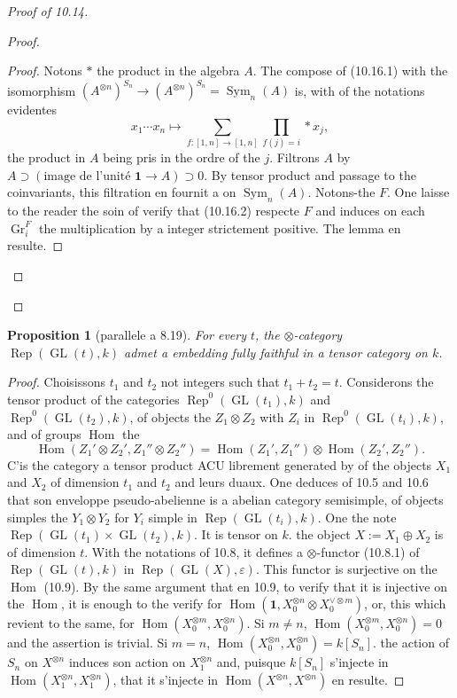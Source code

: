 \documentclass[11pt,a4paper]{article}
\theoremstyle{plain}
\newtheorem{proposition}[theorem]{Proposition}
\theoremstyle{definition}
\DeclareMathOperator{\Hom}{Hom}
\DeclareMathOperator{\Sym}{Sym}
\DeclareMathOperator{\Rep}{Rep}
\DeclareMathOperator{\GL}{GL}
\newcommand{\eps}{\varepsilon}
\DeclareMathOperator{\Gr}{Gr}
\begin{document}
\begin{proof}[Proof of 10.14]
\begin{proof}
\begin{proof}
Notons $\ast$ the product in the algebra $A$. The compose of (10.16.1) with the isomorphism $(A^{\otimes n})^{S_n} \to (A^{\otimes n})^{S_n} = \Sym_n(A)$ is, with of the notations evidentes
\begin{equation}
x_1 \cdots x_n \longmapsto \sum_{f : [1,n] \to [1,n]} \prod_{f(j) = i} \ast x_j, \tag{10.16.2}
\end{equation}
the product in $A$ being pris in the ordre of the $j$. Filtrons $A$ by $A \supset (\text{image de l'unit\'e } \mathbf{1} \to A) \supset 0$. By tensor product and passage to the coinvariants, this filtration en fournit a on $\Sym_n(A)$. Notons-the $F$. One laisse to the reader the soin of verify that (10.16.2) respecte $F$ and induces on each $\Gr_i^F$ the multiplication by a integer strictement positive. The lemma en resulte.
\end{proof}
\end{proof}
\end{proof}

\begin{proposition}[parallele a 8.19]
For every $t$, the $\otimes$-category $\Rep(\GL(t), k)$ admet a embedding fully faithful in a tensor category on $k$.
\end{proposition}

\begin{proof}
Choisissons $t_1$ and $t_2$ not integers such that $t_1 + t_2 = t$. Considerons the tensor product of the categories $\Rep^0(\GL(t_1), k)$ and $\Rep^0(\GL(t_2), k)$, of objects the $Z_1 \otimes Z_2$ with $Z_i$ in $\Rep^0(\GL(t_i), k)$, and of groups $\Hom$ the
\[
\Hom(Z_1' \otimes Z_2', Z_1'' \otimes Z_2'') = \Hom(Z_1', Z_1'') \otimes \Hom(Z_2', Z_2'').
\]
C'is the category a tensor product ACU librement generated by of the objects $X_1$ and $X_2$ of dimension $t_1$ and $t_2$ and leurs duaux. One deduces of 10.5 and 10.6 that son enveloppe pseudo-abelienne is a abelian category semisimple, of objects simples the $Y_1 \otimes Y_2$ for $Y_i$ simple in $\Rep(\GL(t_i), k)$. One the note $\Rep(\GL(t_1) \times \GL(t_2), k)$. It is tensor on $k$. the object $X := X_1 \oplus X_2$ is of dimension $t$. With the notations of 10.8, it defines a $\otimes$-functor (10.8.1) of $\Rep(\GL(t), k)$ in $\Rep(\GL(X), \eps)$. This functor is surjective on the $\Hom$ (10.9). By the same argument that en 10.9, to verify that it is injective on the $\Hom$, it is enough to the verify for $\Hom(\mathbf{1}, X_0^{\otimes n} \otimes X_0^{\vee \otimes m})$, or, this which revient to the same, for $\Hom(X_0^{\otimes m}, X_0^{\otimes n})$. Si $m \neq n$, $\Hom(X_0^{\otimes m}, X_0^{\otimes n}) = 0$ and the assertion is trivial. Si $m = n$, $\Hom(X_0^{\otimes n}, X_0^{\otimes n}) = k[S_n]$. the action of $S_n$ on $X^{\otimes n}$ induces son action on $X_1^{\otimes n}$ and, puisque $k[S_n]$ s'injecte in $\Hom(X_1^{\otimes n}, X_1^{\otimes n})$, that it s'injecte in $\Hom(X^{\otimes n}, X^{\otimes n})$ en resulte.
\end{proof}
\end{document}
